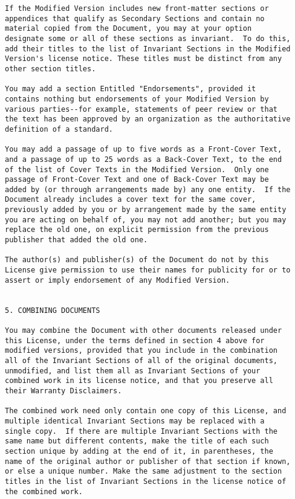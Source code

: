 \begin{verbatim}
If the Modified Version includes new front-matter sections or
appendices that qualify as Secondary Sections and contain no
material copied from the Document, you may at your option
designate some or all of these sections as invariant.  To do this,
add their titles to the list of Invariant Sections in the Modified
Version's license notice. These titles must be distinct from any
other section titles.

You may add a section Entitled "Endorsements", provided it
contains nothing but endorsements of your Modified Version by
various parties--for example, statements of peer review or that
the text has been approved by an organization as the authoritative
definition of a standard.

You may add a passage of up to five words as a Front-Cover Text,
and a passage of up to 25 words as a Back-Cover Text, to the end
of the list of Cover Texts in the Modified Version.  Only one
passage of Front-Cover Text and one of Back-Cover Text may be
added by (or through arrangements made by) any one entity.  If the
Document already includes a cover text for the same cover,
previously added by you or by arrangement made by the same entity
you are acting on behalf of, you may not add another; but you may
replace the old one, on explicit permission from the previous
publisher that added the old one.

The author(s) and publisher(s) of the Document do not by this
License give permission to use their names for publicity for or to
assert or imply endorsement of any Modified Version.


5. COMBINING DOCUMENTS

You may combine the Document with other documents released under
this License, under the terms defined in section 4 above for
modified versions, provided that you include in the combination
all of the Invariant Sections of all of the original documents,
unmodified, and list them all as Invariant Sections of your
combined work in its license notice, and that you preserve all
their Warranty Disclaimers.

The combined work need only contain one copy of this License, and
multiple identical Invariant Sections may be replaced with a
single copy.  If there are multiple Invariant Sections with the
same name but different contents, make the title of each such
section unique by adding at the end of it, in parentheses, the
name of the original author or publisher of that section if known,
or else a unique number. Make the same adjustment to the section
titles in the list of Invariant Sections in the license notice of
the combined work.


\end{verbatim}

